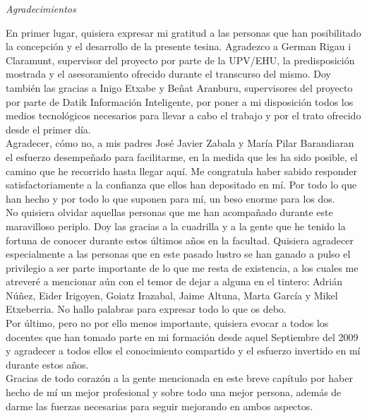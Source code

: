 \begin{flushright}
	\Large\textit{Agradecimientos}
\end{flushright}

En primer lugar, quisiera expresar mi gratitud a las personas que han posibilitado la concepción y el desarrollo de la presente tesina. Agradezco a German Rigau i Claramunt, supervisor del proyecto por parte de la UPV/EHU, la predisposición mostrada y el asesoramiento ofrecido durante el transcurso del mismo. Doy también las gracias a Inigo Etxabe y Beñat Aranburu, supervisores del proyecto por parte de Datik Información Inteligente, por poner a mi disposición todos los medios tecnológicos necesarios para llevar a cabo el trabajo y por el trato ofrecido desde el primer día.\\

Agradecer, cómo no, a mis padres José Javier Zabala y María Pilar Barandiaran el esfuerzo desempeñado para facilitarme, en la medida que les ha sido posible, el camino que he recorrido hasta llegar aquí. Me congratula haber sabido responder satisfactoriamente a la confianza que ellos han depositado en mí. Por todo lo que han hecho y por todo lo que suponen para mí, un beso enorme para los dos.\\

No quisiera olvidar aquellas personas que me han acompañado durante este maravilloso periplo. Doy las gracias a la cuadrilla y a la gente que he tenido la fortuna de conocer durante estos últimos años en la facultad. Quisiera agradecer especialmente a las personas que en este pasado lustro se han ganado a pulso el privilegio a ser parte importante de lo que me resta de existencia, a los cuales me atreveré a mencionar aún con el temor de dejar a alguna en el tintero: Adrián Núñez, Eider Irigoyen, Goiatz Irazabal, Jaime Altuna, Marta García y Mikel Etxeberria. No hallo palabras para expresar todo lo que os debo.\\

Por último, pero no por ello menos importante, quisiera evocar a todos los docentes que han tomado parte en mi formación desde aquel Septiembre del 2009 y agradecer a todos ellos el conocimiento compartido y el esfuerzo invertido en mí durante estos años.\\

Gracias de todo corazón a la gente mencionada en este breve capítulo por haber hecho de mí un mejor profesional y sobre todo una mejor persona, además de darme las fuerzas necesarias para seguir mejorando en ambos aspectos.\\

